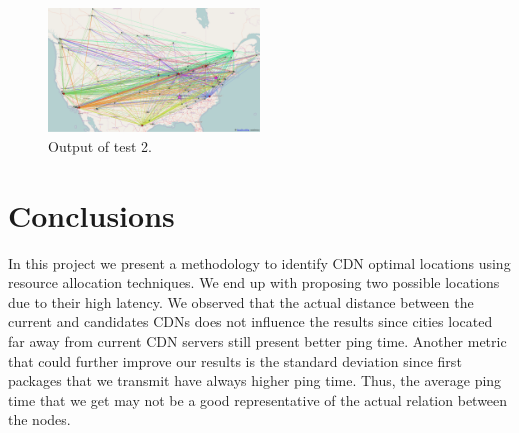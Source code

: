 \documentclass[11pt,twocolumn]{article}
\begin{document}
\begin{figure}
  \centering
  \includegraphics[width=0.5\textwidth]{results.png}
  \caption{Output of test 2.}\label{fig:results}
\end{figure}

\section{Conclusions}
In this project we present a methodology to identify CDN optimal locations using resource allocation techniques.  We end up with proposing two possible locations due to their high latency.  We observed that the actual distance between the current and candidates CDNs does not influence the results since cities located far away from current CDN servers still present better ping time.  Another metric that could further improve our results is the standard deviation since first packages that we transmit have always higher ping time.  Thus, the average ping time that we get may not be a good representative of the actual relation between the nodes.



\end{document}
